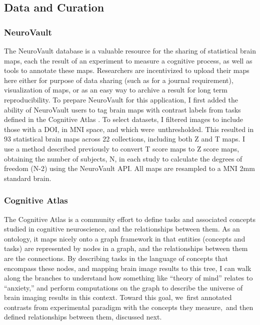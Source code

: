 \documentclass{report}
\begin{document}
\subsection{Data and Curation}

\subsubsection{NeuroVault}

The NeuroVault database is a valuable resource for the sharing of
statistical brain maps, each the result of an experiment to measure a
cognitive process, as well as tools to annotate these maps. Researchers
are incentivized to upload their maps here either for purpose of data
sharing (such as for a journal requirement), visualization of maps, or
as an easy way to archive a result for long term reproducibility. To
prepare NeuroVault for this application, I first added the ability of
NeuroVault users to tag brain maps with contrast labels from tasks
defined in the Cognitive Atlas
 \cite{NeuroVault_undated-gr}.
To select datasets, I filtered images to include those with a DOI, in
MNI space, and which were~unthresholded. This resulted in 93 statistical
brain maps across 22 collections, including both Z and T maps. I use a
method described previously \cite{Sochat2015-qs} to
convert T score maps to Z score maps, obtaining the number of subjects,
N, in each study to calculate the degrees of freedom (N-2) using the
NeuroVault API. All maps are resampled to a MNI 2mm standard brain.

\subsubsection{Cognitive Atlas}

The Cognitive Atlas is a community effort to define tasks and associated
concepts studied in cognitive neuroscience, and the relationships
between them. As an ontology, it maps nicely onto a graph framework in
that entities (concepts and tasks) are represented by nodes in a graph,
and the relationships between them are the connections. By describing
tasks in the language of concepts that encompass these nodes, and
mapping brain image results to this tree, I can walk along the branches
to understand how something like ``theory of mind'' relates to
``anxiety,'' and perform computations on the graph to describe the
universe of brain imaging results in this context. Toward this goal,
we~first annotated contrasts from experimental paradigm with the
concepts they measure,~and then defined relationships between them,
discussed next.
\end{document}
